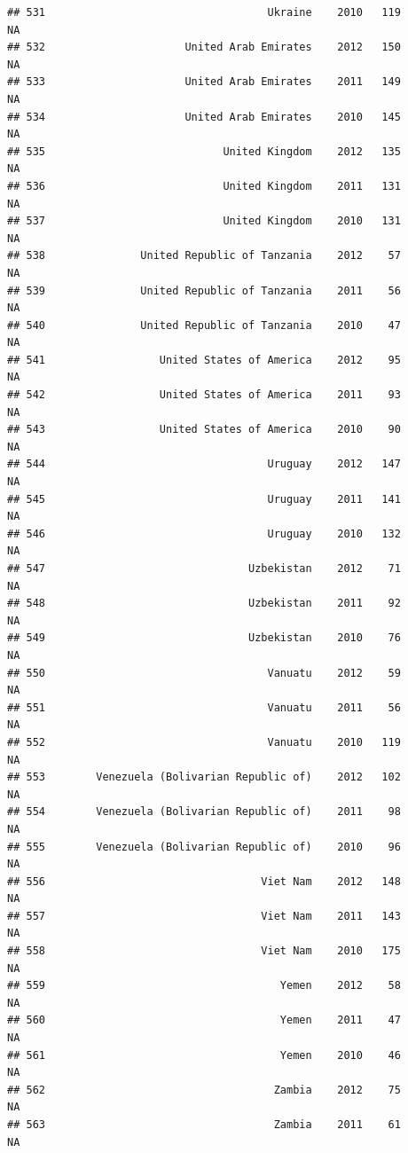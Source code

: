 \documentclass[
]{book}
\begin{document}
\begin{verbatim}
## 531                                   Ukraine    2010   119              NA
## 532                      United Arab Emirates    2012   150              NA
## 533                      United Arab Emirates    2011   149              NA
## 534                      United Arab Emirates    2010   145              NA
## 535                            United Kingdom    2012   135              NA
## 536                            United Kingdom    2011   131              NA
## 537                            United Kingdom    2010   131              NA
## 538               United Republic of Tanzania    2012    57              NA
## 539               United Republic of Tanzania    2011    56              NA
## 540               United Republic of Tanzania    2010    47              NA
## 541                  United States of America    2012    95              NA
## 542                  United States of America    2011    93              NA
## 543                  United States of America    2010    90              NA
## 544                                   Uruguay    2012   147              NA
## 545                                   Uruguay    2011   141              NA
## 546                                   Uruguay    2010   132              NA
## 547                                Uzbekistan    2012    71              NA
## 548                                Uzbekistan    2011    92              NA
## 549                                Uzbekistan    2010    76              NA
## 550                                   Vanuatu    2012    59              NA
## 551                                   Vanuatu    2011    56              NA
## 552                                   Vanuatu    2010   119              NA
## 553        Venezuela (Bolivarian Republic of)    2012   102              NA
## 554        Venezuela (Bolivarian Republic of)    2011    98              NA
## 555        Venezuela (Bolivarian Republic of)    2010    96              NA
## 556                                  Viet Nam    2012   148              NA
## 557                                  Viet Nam    2011   143              NA
## 558                                  Viet Nam    2010   175              NA
## 559                                     Yemen    2012    58              NA
## 560                                     Yemen    2011    47              NA
## 561                                     Yemen    2010    46              NA
## 562                                    Zambia    2012    75              NA
## 563                                    Zambia    2011    61              NA

\end{verbatim}
\end{document}
